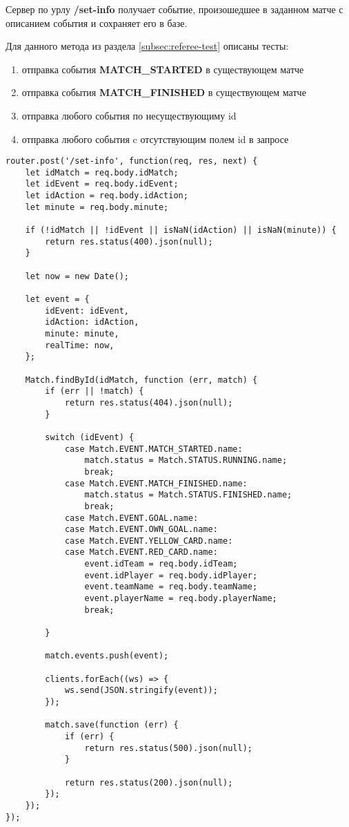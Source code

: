 Сервер по урлу \textbf{/set-info} получает событие, произошедшее в заданном матче с описанием события и сохраняет его в базе.

Для данного метода из раздела \ref{subsec:referee-test} описаны тесты:
\begin{enumerate}
	\item отправка события \textbf{MATCH\_STARTED} в существующем матче
	\item отправка события \textbf{MATCH\_FINISHED} в существующем матче
	\item отправка любого события по несуществующиму id
	\item отправка любого события c отсутствующим полем id в запросе
\end{enumerate}

\begin{lstlisting}[caption={Код метода обработчика урла /set-info}, label={lst:set-info}]
router.post('/set-info', function(req, res, next) {
    let idMatch = req.body.idMatch;
    let idEvent = req.body.idEvent;
    let idAction = req.body.idAction;
    let minute = req.body.minute;

    if (!idMatch || !idEvent || isNaN(idAction) || isNaN(minute)) {
        return res.status(400).json(null);
    }

    let now = new Date();

    let event = {
        idEvent: idEvent,
        idAction: idAction,
        minute: minute,
        realTime: now,
    };

    Match.findById(idMatch, function (err, match) {
        if (err || !match) {
            return res.status(404).json(null);
        }

        switch (idEvent) {
            case Match.EVENT.MATCH_STARTED.name:
                match.status = Match.STATUS.RUNNING.name;
                break;
            case Match.EVENT.MATCH_FINISHED.name:
                match.status = Match.STATUS.FINISHED.name;
                break;
            case Match.EVENT.GOAL.name:
            case Match.EVENT.OWN_GOAL.name:
            case Match.EVENT.YELLOW_CARD.name:
            case Match.EVENT.RED_CARD.name:
                event.idTeam = req.body.idTeam;
                event.idPlayer = req.body.idPlayer;
                event.teamName = req.body.teamName;
                event.playerName = req.body.playerName;
                break;

        }

        match.events.push(event);

        clients.forEach((ws) => {
            ws.send(JSON.stringify(event));
        });

        match.save(function (err) {
            if (err) {
                return res.status(500).json(null);
            }

            return res.status(200).json(null);
        });
    });
});
\end{lstlisting}


